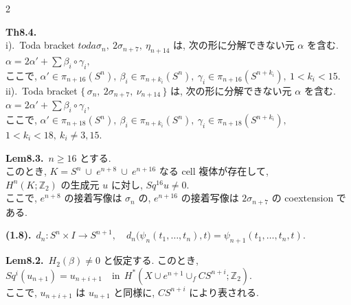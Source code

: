 \documentclass[10pt, leqno]{ltjsarticle}
\newcommand{\toda}[1]{\{\,#1\,\}}              %
\newcommand{\pis}[2]{\pi_{#1}(#2)}       %
\newcommand{\z}{\mathbb{Z}}
\newcommand{\sq}[1]{Sq^{#1}}
\numberwithin{equation}{section}
\theoremstyle{plain}
\theoremstyle{definition}
\theoremstyle{remark}
\begin{document}
\begin{paracol}{2}
\switchcolumn

\noindent
\textbf{Th8.4.}\\
i).\ Toda bracket \(toda{\sigma_n,\ 2\sigma_{n+7},\ \eta_{n+14}}\)
は, 次の形に分解できない元 \(\alpha\) を含む. \\
\(\alpha = 2\alpha' + \sum \beta_i\circ \gamma_i,\) \\
ここで, \(\alpha'\in \pis{n+16}{S^n},\
\beta_i\in \pis{n+k_i}{S^n},\ \gamma_i\in \pis{n+16}{S^{n+k_i}},\ 1<k_i<15.\) \\
ii).\ Toda bracket \(\toda{\sigma_n,\ 2\sigma_{n+7},\ \nu_{n+14}}\)
は, 次の形に分解できない元 \(\alpha\) を含む. \\
\(\alpha = 2\alpha' + \sum \beta_i\circ \gamma_i,\) \\
ここで, \(\alpha'\in \pis{n+18}{S^n},\
\beta_i\in \pis{n+k_i}{S^n},\ \gamma_i\in \pis{n+18}{S^{n+k_i}},\)\\
\(1<k_i<18,\ k_i\ne 3, 15.\)

\noindent
\textbf{Lem8.3.}\
$n\ge16$ とする. \\
このとき,
\(K=S^n\ \cup\ e^{n+8}\ \cup\ e^{n+16}\)
なる \textnormal{cell} 複体が存在して, \\
$H^n(K;\z_2)$ の生成元 $u$ に対し,
\(Sq^{16}u\ne0.\)\\
ここで, 
\(e^{n+8}\) の接着写像は \(\sigma_n\) の,
\(e^{n+16}\) の接着写像は \(2\sigma_{n+7}\) の \textnormal{coextension} である.

\noindent
\textbf{(1.8).}\
\(d_n:S^n\times I\longrightarrow S^{n+1},\quad
d_n\bigl(\psi_n(t_1,\ldots,t_n),t\bigr)=\psi_{n+1}(t_1,\ldots,t_n,t).\)

\noindent
\textbf{Lem8.2.}\
$H_2(\beta)\ne0$ と仮定する. このとき,\\
\(
\sq{i}(u_{n+1}) = u_{n+i+1}
\quad\text{in} \ \ H^\ast (X\cup e^{n+1}\cup_f CS^{n+i}; \z_2).
\)\\
ここで, $u_{n+i+1}$ は $u_{n+1}$ と同様に, $CS^{n+i}$ により表される. 




\end{paracol}
\end{document}
